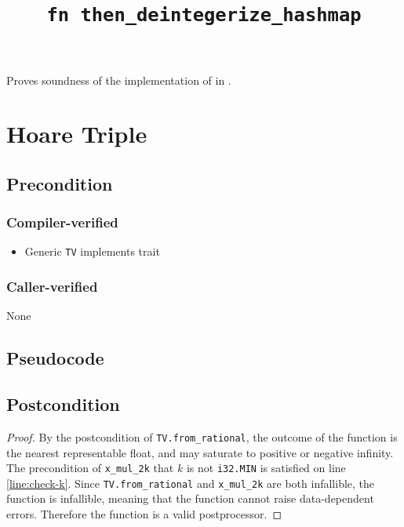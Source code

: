 \documentclass{article}
\title{\texttt{fn then\_deintegerize\_hashmap}}
\author{\MichaelShoemateAuthor}
\date{}
\begin{document}
\maketitle

\contrib
Proves soundness of the implementation of  in .

\section{Hoare Triple}
\subsection*{Precondition}
\subsubsection*{Compiler-verified}

\begin{itemize}
    \item Generic \texttt{TV} implements trait 
\end{itemize}

\subsubsection*{Caller-verified}
None

\subsection*{Pseudocode}


\subsection*{Postcondition}
\begin{theorem}
\end{theorem}

\begin{proof}
    By the postcondition of \texttt{TV.from\_rational},
    the outcome of the function is the nearest representable float,
    and may saturate to positive or negative infinity.
    The precondition of \texttt{x\_mul\_2k} that $k$ is not \texttt{i32.MIN} is satisfied on line \ref{line:check-k}.
    Since \texttt{TV.from\_rational} and \texttt{x\_mul\_2k} are both infallible,
    the function is infallible,
    meaning that the function cannot raise data-dependent errors.
    Therefore the function is a valid postprocessor.
\end{proof}
\end{document}
